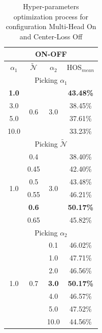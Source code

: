 \documentclass[10pt,twocolumn,letterpaper]{article}
\begin{document}
\begin{table}[t!]
  \vspace{-1.7cm}
  \centering
  \begin{tabular}[h]{||c|c|c||c||}
    \hline
    \multicolumn{4}{||c||}{ON-OFF} \\
    \hline
    $\alpha_1$ & $\mathcal{\tilde N}$ & $\alpha_2$ & HOS$_{mean}$\\    
    \hline
    \hline
    \multicolumn{4}{||c||}{Picking $\alpha_1$} \\
    \hline
    {\bf 1.0}  & \multirow{4}{*}{0.6} & \multirow{4}{*}{3.0} & {\bf 43.48\%} \\
    3.0  & & & 38.45\% \\
    5.0  & & & 37.61\% \\
    10.0 & & & 33.23\% \\
    \hline
    \hline
    \multicolumn{4}{||c||}{Picking $\mathcal{\tilde N}$} \\
    \hline
    \multirow{6}{*}{1.0} & 0.4 & \multirow{6}{*}{3.0}  & 38.40\%\\
    & 0.45 & & 42.40\% \\
    & 0.5 & & 43.48\% \\
    & 0.55 & & 46.21\% \\
    & {\bf0.6} & & {\bf 50.17\%} \\
    & 0.65 & & 45.82\% \\
    \hline
    \hline
    \multicolumn{4}{||c||}{Picking $\alpha_2$} \\
    \hline
    \multirow{7}{*}{1.0} & \multirow{7}{*}{0.7} & 0.1 & 46.02\%\\
    && 1.0 & 47.71\% \\
    && 2.0 & 46.56\% \\
    && {\bf 3.0} & {\bf 50.17\%} \\
    && 4.0 & 46.57\% \\
    && 5.0 & 47.52\% \\
    && 10.0 & 44.56\% \\
    \hline
  \end{tabular}
  \caption{\centering\label{tab:ablationonoff} Hyper-parameters optimization process for configuration Multi-Head On and Center-Loss Off}
\end{table}
\end{document}
